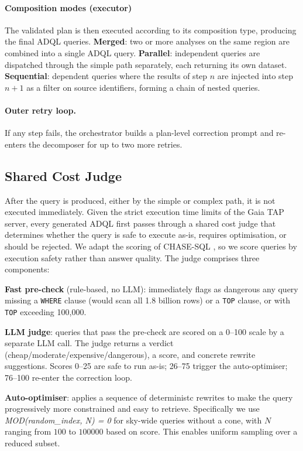 \documentclass[fleqn,moreauthors,10pt]{ds_report}
\begin{document}
\paragraph{Composition modes (executor)}
The validated plan is then executed according to its composition type, producing 
the final ADQL queries. \textbf{Merged}: two or more analyses on the same region 
are combined into a single ADQL query. \textbf{Parallel}: independent queries 
are dispatched through the simple path separately, each returning its own 
dataset. \textbf{Sequential}: dependent queries where the results of step $n$ 
are injected into step $n+1$ as a filter on source identifiers, forming a chain 
of nested queries.


\paragraph{Outer retry loop.}

If any step fails, the orchestrator 
builds a plan-level correction prompt and re-enters the decomposer for up to 
two more retries.


\subsection{Shared Cost Judge}

After the query is produced, either by the simple or complex path, it is not executed immediately. Given the strict execution time limits of the Gaia TAP server, every generated ADQL first passes through a shared cost judge that determines whether the query is safe to execute as-is, requires optimisation, or should be rejected. We adapt the scoring of CHASE-SQL \cite{chasesql2024}, so we score queries by execution safety rather than answer quality. The judge comprises three components:

\textbf{Fast pre-check} (rule-based, no LLM): immediately flags as dangerous any
query missing a \texttt{WHERE} clause (would scan all 1.8 billion rows) or a
\texttt{TOP} clause, or with \texttt{TOP} exceeding 100,000.

\textbf{LLM judge}: queries that pass the pre-check are scored on a 0--100 scale
by a separate LLM call. The judge returns a verdict
(cheap/moderate/expensive/dangerous), a score,
and concrete rewrite suggestions. Scores 0--25 are safe to run as-is; 26--75
trigger the auto-optimiser; 76--100 re-enter the correction loop.

\textbf{Auto-optimiser}: applies a sequence of deterministc rewrites to make
the query progressively more constrained and easy to retrieve. Specifically we use
\textit{MOD(random\_index, N) = 0} for sky-wide queries without a cone, with $N$ ranging from $100$ to $100000$ based on score. This enables uniform sampling over a reduced subset.
\end{document}
